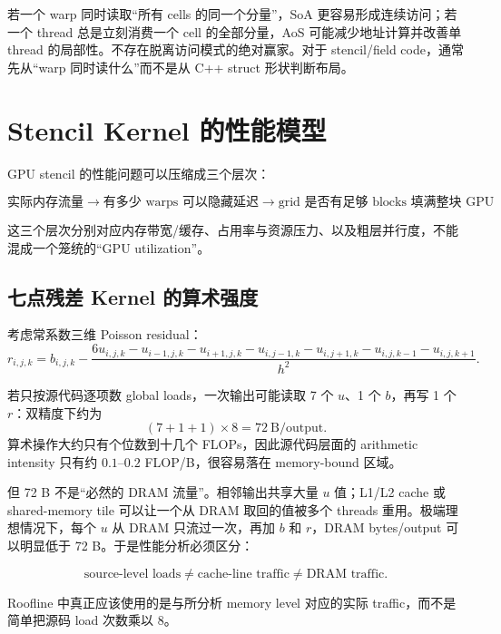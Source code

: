 若一个 warp 同时读取“所有 cells 的同一个分量”，SoA 更容易形成连续访问；若一个 thread 总是立刻消费一个 cell 的全部分量，AoS 可能减少地址计算并改善单 thread 的局部性。不存在脱离访问模式的绝对赢家。对于 stencil/field code，通常先从“warp 同时读什么”而不是从 C++ struct 形状判断布局。

\section{Stencil Kernel 的性能模型}
\label{sec:gpu-stencil-performance}

GPU stencil 的性能问题可以压缩成三个层次：

\[
\boxed{
\text{实际内存流量}
\rightarrow
\text{有多少 warps 可以隐藏延迟}
\rightarrow
\text{grid 是否有足够 blocks 填满整块 GPU}
}
\]

这三个层次分别对应内存带宽/缓存、占用率与资源压力、以及粗层并行度，不能混成一个笼统的“GPU utilization”。

\subsection{七点残差 Kernel 的算术强度}

考虑常系数三维 Poisson residual：
\begin{equation}
r_{i,j,k}
=b_{i,j,k}
-\frac{6u_{i,j,k}-u_{i-1,j,k}-u_{i+1,j,k}-u_{i,j-1,k}-u_{i,j+1,k}-u_{i,j,k-1}-u_{i,j,k+1}}{h^2}.
\label{eq:gpu-seven-point-residual}
\end{equation}

若只按源代码逐项数 global loads，一次输出可能读取 7 个 $u$、1 个 $b$，再写 1 个 $r$：双精度下约为
\begin{equation}
(7+1+1)\times8=72\ \text{B/output}.
\end{equation}
算术操作大约只有个位数到十几个 FLOPs，因此源代码层面的 arithmetic intensity 只有约 $0.1$--$0.2$ FLOP/B，很容易落在 memory-bound 区域。

但 72 B 不是“必然的 DRAM 流量”。相邻输出共享大量 $u$ 值；L1/L2 cache 或 shared-memory tile 可以让一个从 DRAM 取回的值被多个 threads 重用。极端理想情况下，每个 $u$ 从 DRAM 只流过一次，再加 $b$ 和 $r$，DRAM bytes/output 可以明显低于 72 B。于是性能分析必须区分：

\begin{equation}
\boxed{
\text{source-level loads}
\neq
\text{cache-line traffic}
\neq
\text{DRAM traffic}.
}
\label{eq:gpu-memory-traffic-levels}
\end{equation}

Roofline 中真正应该使用的是与所分析 memory level 对应的实际 traffic，而不是简单把源码 load 次数乘以 8\cite{nsightCompute2026}。

